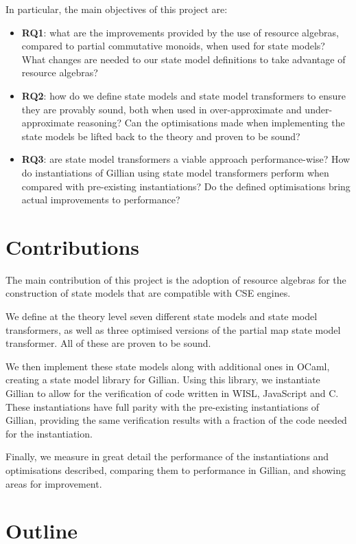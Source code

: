 In particular, the main objectives of this project are: \begin{itemize}
	\item \textbf{RQ1}: what are the improvements provided by the use of resource algebras, compared to partial commutative monoids, when used for state models? What changes are needed to our state model definitions to take advantage of resource algebras?
	\item \textbf{RQ2}: how do we define state models and state model transformers to ensure they are provably sound, both when used in over-approximate and under-approximate reasoning? Can the optimisations made when implementing the state models be lifted back to the theory and proven to be sound?
	\item \textbf{RQ3}: are state model transformers a viable approach performance-wise? How do instantiations of Gillian using state model transformers perform when compared with pre-existing instantiations? Do the defined optimisations bring actual improvements to performance?
\end{itemize}

\section{Contributions}

The main contribution of this project is the adoption of resource algebras for the construction of state models that are compatible with CSE engines.

We define at the theory level seven different state models and state model transformers, as well as three optimised versions of the partial map state model transformer. All of these are proven to be sound.

We then implement these state models along with additional ones in OCaml, creating a state model library for Gillian. Using this library, we instantiate Gillian to allow for the verification of code written in WISL, JavaScript and C. These instantiations have full parity with the pre-existing instantiations of Gillian, providing the same verification results with a fraction of the code needed for the instantiation.

Finally, we measure in great detail the performance of the instantiations and optimisations described, comparing them to performance in Gillian, and showing areas for improvement.

\section{Outline}

